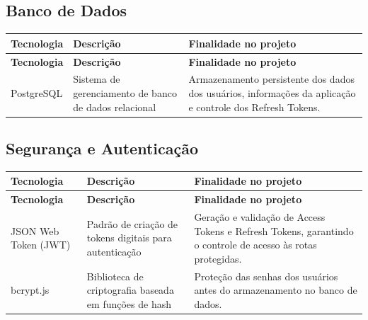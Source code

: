 \documentclass[12pt]{article}
\begin{document}
\subsection{Banco de Dados}

\begin{longtable}{|p{3cm}|p{4.2cm}|p{7cm}|}
  \hline
  \textbf{Tecnologia}                                   & \textbf{Descrição} & \textbf{Finalidade no projeto} \\
  \hline
  \endfirsthead

  \hline
  \textbf{Tecnologia}                                   & \textbf{Descrição} & \textbf{Finalidade no projeto} \\
  \hline
  \endhead

  PostgreSQL                                            &
  Sistema de gerenciamento de banco de dados relacional &
  Armazenamento persistente dos dados dos usuários, informações da aplicação e controle dos Refresh Tokens.   \\
  \hline
\end{longtable}

\subsection{Segurança e Autenticação}

\begin{longtable}{|p{3cm}|p{4.2cm}|p{7cm}|}
  \hline
  \textbf{Tecnologia}                                    & \textbf{Descrição} & \textbf{Finalidade no projeto} \\
  \hline
  \endfirsthead

  \hline
  \textbf{Tecnologia}                                    & \textbf{Descrição} & \textbf{Finalidade no projeto} \\
  \hline
  \endhead

  JSON Web Token (JWT)                                   &
  Padrão de criação de tokens digitais para autenticação &
  Geração e validação de Access Tokens e Refresh Tokens, garantindo o controle de acesso às rotas protegidas.  \\
  \hline

  bcrypt.js                                              &
  Biblioteca de criptografia baseada em funções de hash  &
  Proteção das senhas dos usuários antes do armazenamento no banco de dados.                                   \\
  \hline
\end{longtable}
\end{document}
